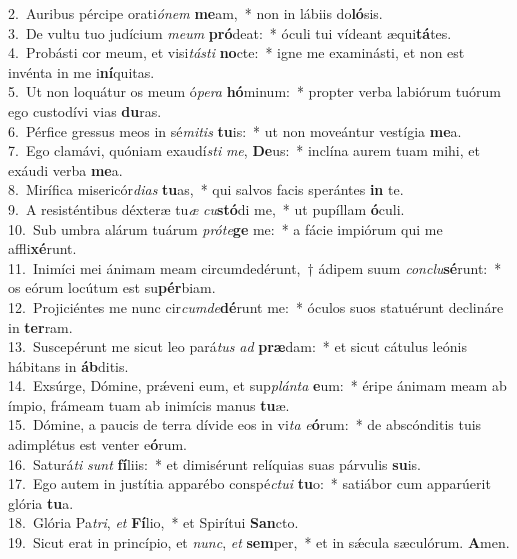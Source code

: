 {2.~}Auribus pércipe orati\textit{ó}\textit{nem} \textbf{me}am,~* non in lábiis do\textbf{ló}sis.\\
{3.~}De vultu tuo judícium \textit{me}\textit{um} \textbf{pró}deat:~* óculi tui vídeant æqui\textbf{tá}tes.\\
{4.~}Probásti cor meum, et visi\textit{tá}\textit{sti} \textbf{no}cte:~* igne me examinásti, et non est invénta in me i\textbf{ní}quitas.\\
{5.~}Ut non loquátur os meum ó\textit{pe}\textit{ra} \textbf{hó}minum:~* propter verba labiórum tuórum ego custodívi vias \textbf{du}ras.\\
{6.~}Pérfice gressus meos in sé\textit{mi}\textit{tis} \textbf{tu}is:~* ut non moveántur vestígia \textbf{me}a.\\
{7.~}Ego clamávi, quóniam exaudí\textit{sti} \textit{me}, \textbf{De}us:~* inclína aurem tuam mihi, et exáudi verba \textbf{me}a.\\
{8.~}Mirífica misericór\textit{di}\textit{as} \textbf{tu}as,~* qui salvos facis sperántes \textbf{in} te.\\
{9.~}A resisténtibus déxteræ tu\textit{æ} \textit{cu}\textbf{stó}di me,~* ut pupíllam \textbf{ó}culi.\\
{10.~}Sub umbra alárum tuárum \textit{pró}\textit{te}\textbf{ge} me:~* a fácie impiórum qui me affli\textbf{xé}runt.\\
{11.~}Inimíci mei ánimam meam circumdedérunt,~† ádipem suum \textit{con}\textit{clu}\textbf{sé}runt:~* os eórum locútum est su\textbf{pér}biam.\\
{12.~}Projiciéntes me nunc cir\textit{cum}\textit{de}\textbf{dé}runt me:~* óculos suos statuérunt declináre in \textbf{ter}ram.\\
{13.~}Suscepérunt me sicut leo pará\textit{tus} \textit{ad} \textbf{præ}dam:~* et sicut cátulus leónis hábitans in \textbf{áb}ditis.\\
{14.~}Exsúrge, Dómine, prǽveni eum, et sup\textit{plán}\textit{ta} \textbf{e}um:~* éripe ánimam meam ab ímpio, frámeam tuam ab inimícis manus \textbf{tu}æ.\\
{15.~}Dómine, a paucis de terra dívide eos in vi\textit{ta} \textit{e}\textbf{ó}rum:~* de abscónditis tuis adimplétus est venter e\textbf{ó}rum.\\
{16.~}Saturá\textit{ti} \textit{sunt} \textbf{fí}liis:~* et dimisérunt relíquias suas párvulis \textbf{su}is.\\
{17.~}Ego autem in justítia apparébo conspé\textit{ctu}\textit{i} \textbf{tu}o:~* satiábor cum apparúerit glória \textbf{tu}a.\\
{18.~}Glória Pa\textit{tri}, \textit{et} \textbf{Fí}lio,~* et Spirítui \textbf{San}cto.\\
{19.~}Sicut erat in princípio, et \textit{nunc}, \textit{et} \textbf{sem}per,~* et in sǽcula sæculórum. \textbf{A}men.\\
